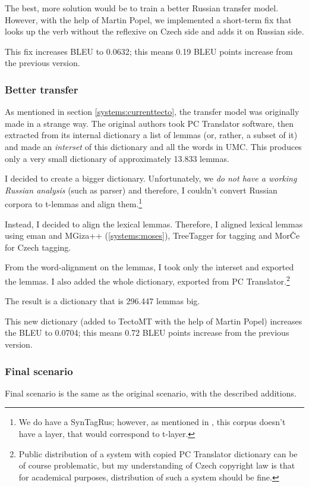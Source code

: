 The best, more  solution would be to train a better Russian transfer model. However, with the help of Martin Popel, we implemented a short-term fix that looks up the verb without the reflexive on Czech side and adds it on Russian side.

This fix increases BLEU to 0.0632; this means 0.19 BLEU points increase from the previous version. 

\subsubsection{Better transfer}
As mentioned in section \ref{systems:currenttecto}, the transfer model was originally made in a strange way. 
The original authors took PC Translator software, then extracted from its internal dictionary a list of lemmas (or, rather, a subset of it) and made an \emph{interset} of this dictionary and all the words in UMC. This produces only a very small dictionary of approximately 13.833 lemmas. 

I decided to create a bigger dictionary. Unfortunately, we \emph{do not have a working Russian analysis} (such as parser) and therefore, I couldn't convert Russian corpora to t-lemmas and align them.\footnote{We do have a SynTagRus; however, as mentioned in \cite{syntagrus_pdt}, this corpus doesn't have a layer, that would correspond to t-layer.}

Instead, I decided to align  the lexical lemmas. Therefore, I aligned lexical lemmas using eman and MGiza++ (\ref{systems:moses}), TreeTagger for tagging and MorČe for Czech tagging.

From the word-alignment on the lemmas, I took only the interset and exported the lemmas. I also added the whole dictionary, exported from PC Translator.\footnote{Public distribution of a system with  copied PC Translator dictionary can be of course problematic, but my understanding of Czech copyright law is that for academical purposes, distribution of such a system should be fine.}



The result is a dictionary that is 296.447 lemmas big.

This new dictionary (added to TectoMT with the help of Martin Popel) increases the BLEU to 0.0704; this means 0.72 BLEU points increase from the previous version.
\subsubsection{Final scenario}
Final scenario is the same as the original scenario, with the described additions.

